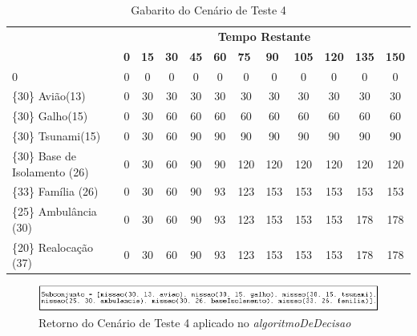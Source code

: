 \begin{table}[!h]
\centering
\caption{Gabarito do Cenário de Teste 4}
\label{gabarito4}
\begin{tabular}{lccccccccccc}
\multicolumn{1}{c}{\cellcolor[HTML]{00D2CB}} & \multicolumn{11}{c}{\cellcolor[HTML]{00D2CB}\textbf{Tempo Restante}} \\ 
\multicolumn{1}{c}{\cellcolor[HTML]{00D2CB}{\color[HTML]{333333} \textbf{\{Valor\} Missão(Tempo)}}} & 
\multicolumn{1}{l}{\cellcolor[HTML]{C0F2F0}\textbf{0}} & 
\multicolumn{1}{l}{\cellcolor[HTML]{C0F2F0}\textbf{15}} & 
\multicolumn{1}{l}{\cellcolor[HTML]{C0F2F0}\textbf{30}} & 
\multicolumn{1}{l}{\cellcolor[HTML]{C0F2F0}\textbf{45}} & 
\multicolumn{1}{l}{\cellcolor[HTML]{C0F2F0}\textbf{60}} & 
\multicolumn{1}{l}{\cellcolor[HTML]{C0F2F0}\textbf{75}} & 
\multicolumn{1}{l}{\cellcolor[HTML]{C0F2F0}\textbf{90}} & 
\multicolumn{1}{l}{\cellcolor[HTML]{C0F2F0}\textbf{105}} & 
\multicolumn{1}{l}{\cellcolor[HTML]{C0F2F0}\textbf{120}} & 
\multicolumn{1}{l}{\cellcolor[HTML]{C0F2F0}\textbf{135}} & 
\multicolumn{1}{l}{\cellcolor[HTML]{C0F2F0}\textbf{150}} \\ 
0 & 0 & 0 & 0 & 0 & 0 & 0 & 0 & 0 & 0 & 0 & 0  \\ 
\{30\}  Avião(13) & 0 & 30 & 30 & 30 & 30 & 30 & 30 & 30 & 30 & 30 & 30 \\ 
\{30\}  Galho(15) & 0 & 30 & 60 & 60 & 60 & 60 & 60 & 60 & 60 & 60 & 60  \\ 
\{30\}  Tsunami(15) & 0 & 30 & 60 & 90 & 90 & 90 & 90 & 90 & 90 & 90 & 90 \\ 
\{30\}  Base de Isolamento (26) & 0 & 30 & 60 & 90 & 90 & 120  & 120  & 120 & 120 & 120 & 120 \\ 
\{33\}  Família (26) & 0 & 30 & 60 & 90 & 93  & 123  & 153  & 153 & 153 & 153 & 153 \\ 
\{25\}  Ambulância (30) & 0 & 30 & 60 & 90 & 93  & 123  & 153  & 153 & 153 & 178 & 178 \\ 
{\color[HTML]{FE0000} \{20\}  Realocação (37)} & 0 & 30 & 60 & 90 & 93  & 123  & 153  & 153 & 153 & 178 & 178 \\ 
\end{tabular}
\end{table}


\FloatBarrier
\begin{figure}[!h]
\centering
\includegraphics[keepaspectratio=true,scale=0.7]{figuras/resultado4.png}
\caption{Retorno do Cenário de Teste 4 aplicado no \textit{algoritmoDeDecisao}}
\label{resultado4}
\end{figure}


